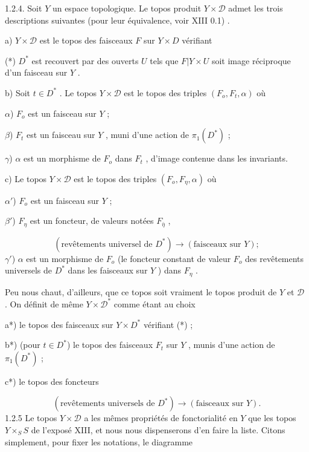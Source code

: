 1.2.4. Soit $Y$ un espace topologique. Le topos produit $Y \times \mathcal{D}$ admet les trois descriptions suivantes (pour leur équivalence, voir XIII 0.1) .

a) $Y \times \mathcal{D}$ est le topos des faisceaux $F$ sur $Y \times D$ vérifiant

(*) $D^*$ est recouvert par des ouverts $U$ tels que $F | Y \times U$ soit image réciproque d'un faisceau sur $Y$ .

b) Soit $t \in D^*$ . Le topos $Y \times \mathcal{D}$ est le topos des triples $(F_o, F_t, \alpha)$ où

$\alpha$) $F_o$ est un faisceau sur $Y$ ;

$\beta$) $F_t$ est un faisceau sur $Y$ , muni d'une action de $\pi_1(D^*)$ ;

$\gamma$) $\alpha$ est un morphisme de $F_o$ dans $F_t$ , d'image contenue dans les invariants.

c) Le topos $Y \times \mathcal{D}$ est le topos des triples $(F_o, F_\eta, \alpha)$ où

$\alpha'$) $F_o$ est un faisceau sur $Y$ ;

$\beta'$) $F_\eta$ est un foncteur, de valeurs notées $F_{\bar\eta}$ ,

\begin{equation*}
(\text{revêtements universel de } D^*) \longrightarrow (\text{faisceaux sur } Y ) ;
\end{equation*}
$\gamma'$) $\alpha$ est un morphisme de $F_o$ (le foncteur constant de valeur $F_o$ des revêtements universels de $D^*$ dans les faisceaux sur $Y$ ) dans $F_\eta$ .

Peu nous chaut, d'ailleurs, que ce topos soit vraiment le topos produit de $Y$ et $\mathcal{D}$ . On définit de même $Y \times \mathcal{D}^*$ comme étant au choix

a*) le topos des faisceaux sur $Y \times D^*$ vérifiant (*) ;

b*) (pour $t \in D^*$) le topos des faisceaux $F_t$ sur $Y$ , munis d'une action de $\pi_1(D^*)$ ;

c*) le topos des foncteurs

\begin{equation*}
(\text{revêtements universels de } D^*) \longrightarrow (\text{faisceaux sur } Y ).
\end{equation*}
1.2.5 Le topos $Y \times \mathcal{D}$ a les mêmes propriétés de fonctorialité en $Y$ que les topos $Y \times_S S$ de l'exposé XIII, et nous nous dispenserons d'en faire la liste. Citons simplement, pour fixer les notations, le diagramme 



